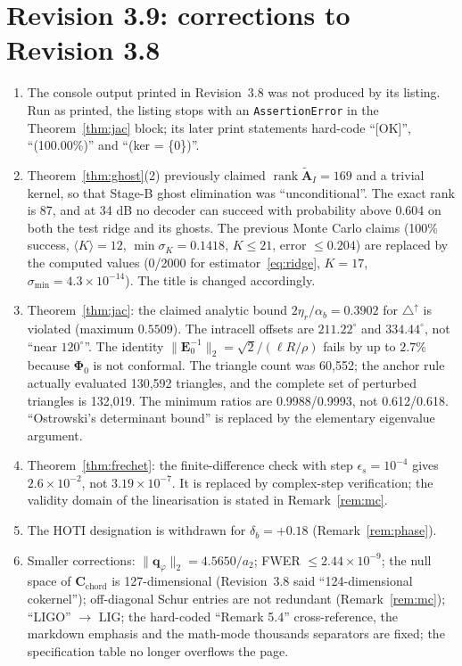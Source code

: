 \documentclass[11pt,a4paper]{article}
\theoremstyle{definition}
\theoremstyle{remark}
\begin{document}
\section*{Revision 3.9: corrections to Revision 3.8}
\begin{enumerate}[noitemsep,leftmargin=*]
\item The console output printed in Revision~3.8 was not produced by its listing. Run as printed, the listing stops with an \texttt{AssertionError} in the Theorem~\ref{thm:jac} block; its later print statements hard-code ``[OK]'', ``(100.00\%)'' and ``(ker = \{0\})''.
\item Theorem~\ref{thm:ghost}(2) previously claimed $\operatorname{rank}\widetilde{\mathbf{A}}_I = 169$ and a trivial kernel, so that Stage-B ghost elimination was ``unconditional''. The exact rank is 87, and at 34 dB no decoder can succeed with probability above 0.604 on both the test ridge and its ghosts. The previous Monte Carlo claims (100\% success, $\langle K\rangle = 12$, $\min\sigma_K = 0.1418$, $K\le21$, error $\le0.204$) are replaced by the computed values (0/2000 for estimator~\eqref{eq:ridge}, $K=17$, $\sigma_{\min} = 4.3\times10^{-14}$). The title is changed accordingly.
\item Theorem~\ref{thm:jac}: the claimed analytic bound $2\eta_r/\alpha_b = 0.3902$ for $\triangle^{\uparrow}$ is violated (maximum $0.5509$). The intracell offsets are $211.22^\circ$ and $334.44^\circ$, not ``near $120^\circ$''. The identity $\|\mathbf{E}_0^{-1}\|_2 = \sqrt2/(\ell R/\rho)$ fails by up to $2.7\%$ because $\mathbf{\Phi}_0$ is not conformal. The triangle count was 60{,}552; the anchor rule actually evaluated 130{,}592 triangles, and the complete set of perturbed triangles is 132{,}019. The minimum ratios are 0.9988/0.9993, not 0.612/0.618. ``Ostrowski's determinant bound'' is replaced by the elementary eigenvalue argument.
\item Theorem~\ref{thm:frechet}: the finite-difference check with step $\epsilon_s = 10^{-4}$ gives $2.6\times10^{-2}$, not $3.19\times10^{-7}$. It is replaced by complex-step verification; the validity domain of the linearisation is stated in Remark~\ref{rem:mc}.
\item The HOTI designation is withdrawn for $\delta_b = +0.18$ (Remark~\ref{rem:phase}).
\item Smaller corrections: $\|\mathbf{q}_\varphi\|_2 = 4.5650/a_2$; FWER $\le 2.44\times10^{-9}$; the null space of $\mathbf{C}_{\text{chord}}$ is 127-dimensional (Revision~3.8 said ``124-dimensional cokernel''); off-diagonal Schur entries are not redundant (Remark~\ref{rem:mc}); ``LIGO'' $\to$ LIG; the hard-coded ``Remark 5.4'' cross-reference, the markdown emphasis and the math-mode thousands separators are fixed; the specification table no longer overflows the page.
\end{enumerate}
\end{document}
